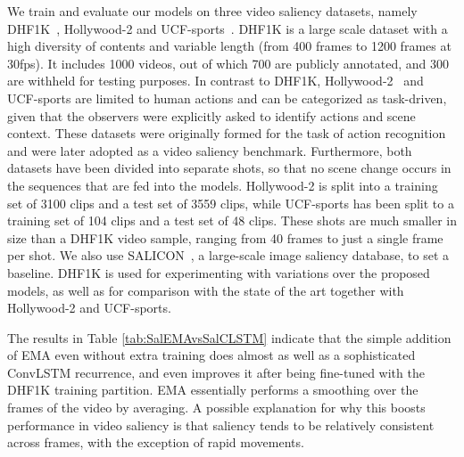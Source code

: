 \documentclass{bmvc2k}
\begin{document}
We train and evaluate our models on three video saliency datasets, namely DHF1K~\cite{Wang2018a}, Hollywood-2 and UCF-sports~\cite{Hollywood_UCF}. DHF1K is a large scale dataset with a high diversity of contents and variable length (from 400 frames to 1200 frames at 30fps). It includes 1000 videos, out of which 700 are publicly annotated, and 300 are withheld for testing purposes. In contrast to DHF1K, Hollywood-2~\cite{Hollywood-Origins} and UCF-sports \cite{soomro2014action} are limited to human actions and can be categorized as task-driven, given that the observers were explicitly asked to identify actions and scene context. These datasets were originally formed for the task of action recognition and were later adopted as a video saliency benchmark. Furthermore, both datasets have been divided into separate shots, so that no scene change occurs in the sequences that are fed into the models. Hollywood-2 is split into a training set of 3100 clips and a test set of 3559 clips, while UCF-sports has been split to a training set of 104 clips and a test set of 48 clips. These shots are much smaller in size than a DHF1K video sample, ranging from 40 frames to just a single frame per shot. We also use SALICON~\cite{SALICON}, a large-scale image saliency database, to set a baseline.
DHF1K is used for experimenting with variations over the proposed models, as well as for comparison with the state of the art together with Hollywood-2 and UCF-sports.




The results in Table \ref{tab:SalEMAvsSalCLSTM} indicate that the simple addition of EMA even without extra training does almost as well as a sophisticated ConvLSTM recurrence, and even improves it after being fine-tuned with the DHF1K training partition. EMA essentially performs a smoothing over the frames of the video by averaging. A possible explanation for why this boosts performance in video saliency is that saliency tends to be relatively consistent across frames, with the exception of rapid movements. 
\end{document}
